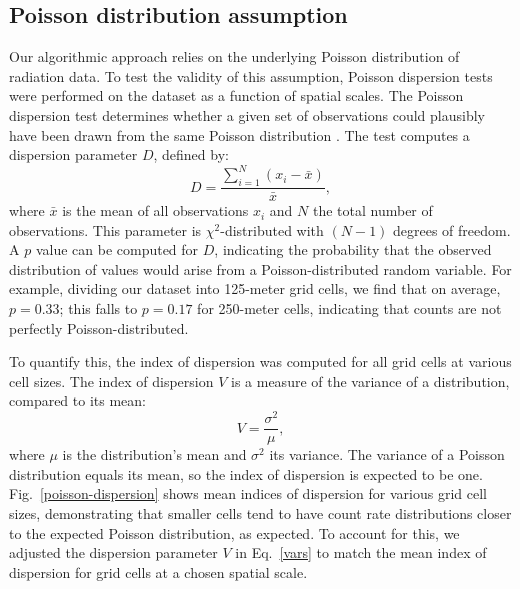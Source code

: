 \subsection{Poisson distribution assumption}

Our algorithmic approach relies on the underlying Poisson distribution of
radiation data.  To test the validity of this assumption, Poisson dispersion
tests were performed on the dataset as a function of spatial scales. The Poisson
dispersion test determines whether a given set of observations could plausibly
have been drawn from the same Poisson distribution \cite{Rao:1956vp}. The test
computes a dispersion parameter \(D\), defined by:
\begin{equation}
D = \frac{\sum_{i=1}^N (x_i - \bar{x})}{\bar{x}},
\end{equation}
where \(\bar{x}\) is the mean of all observations \(x_i\) and \(N\) the total
number of observations. This parameter is \(\chi^2\)-distributed with \((N -
1)\) degrees of freedom. A \(p\) value can be computed for \(D\), indicating the
probability that the observed distribution of values would arise from a
Poisson-distributed random variable. For example, dividing our dataset into
125-meter grid cells, we find that on average, \(p = 0.33\); this falls to \(p =
0.17\) for 250-meter cells, indicating that counts are not perfectly
Poisson-distributed.

To quantify this, the index of dispersion was computed for all grid cells at
various cell sizes. The index of dispersion \(V\) is a measure of the variance
of a distribution, compared to its mean:
\begin{equation}
V = \frac{\sigma^2}{\mu},
\end{equation}
where \(\mu\) is the distribution's mean and \(\sigma^2\) its variance. The
variance of a Poisson distribution equals its mean, so the index of dispersion
is expected to be one. Fig.\ \ref{poisson-dispersion} shows mean indices of
dispersion for various grid cell sizes, demonstrating that smaller cells tend to
have count rate distributions closer to the expected Poisson distribution, as
expected. To account for this, we adjusted the dispersion parameter \(V\) in
Eq.~\ref{vars} to match the mean index of dispersion for grid cells at a
chosen spatial scale.

